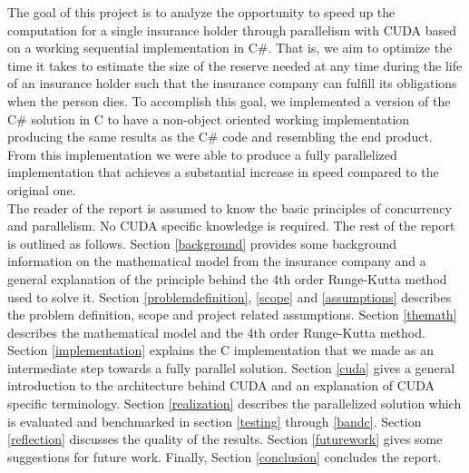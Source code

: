 The goal of this project is to analyze the opportunity to speed up the computation for a single insurance holder through parallelism with CUDA based on a working sequential implementation in C\#. That is, we aim to optimize the time it takes to estimate the size of the reserve needed at any time during the life of an insurance holder such that the insurance company can fulfill its obligations when the person dies. To accomplish this goal, we implemented a version of the C\# solution in C to have a non-object oriented working implementation producing the same results as the C\# code and resembling the end product. From this implementation we were able to produce a fully parallelized implementation that achieves a substantial increase in speed compared to the original one.\\

The reader of the report is assumed to know the basic principles of concurrency and parallelism. No CUDA specific knowledge is required. The rest of the report is outlined as follows. Section \ref{background} provides some background information on the mathematical model from the insurance company and a general explanation of the principle behind the 4th order Runge-Kutta method used to solve it. Section \ref{problemdefinition}, \ref{scope} and \ref{assumptions} describes the problem definition, scope and project related assumptions. Section \ref{themath} describes the mathematical model and the 4th order Runge-Kutta method. Section \ref{implementation} explains the C implementation that we made as an intermediate step towards a fully parallel solution. Section \ref{cuda} gives a general introduction to the architecture behind CUDA and an explanation of CUDA specific terminology. Section \ref{realization} describes the parallelized solution which is evaluated and benchmarked in section \ref{testing} through \ref{bandc}. Section \ref{reflection} discusses the quality of the results. Section \ref{futurework} gives some suggestions for future work. Finally, Section \ref{conclusion} concludes the report.
